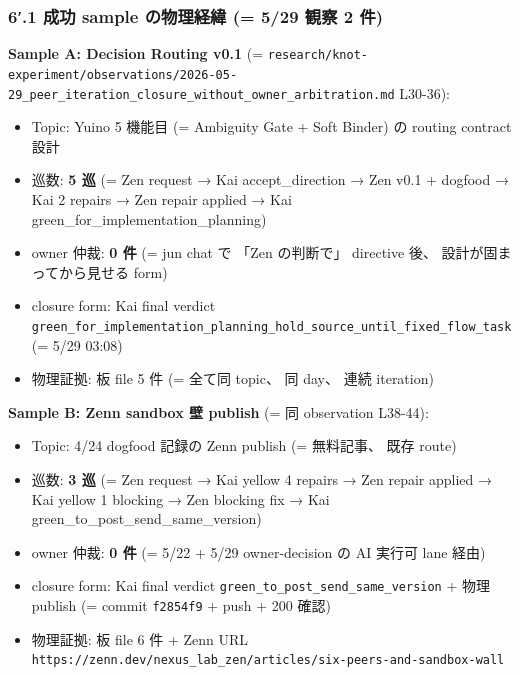 \documentclass[
]{article}
\providecommand{\tightlist}{%
  \setlength{\itemsep}{0pt}\setlength{\parskip}{0pt}}
\begin{document}
\subsubsection{6′.1 成功 sample の物理経緯 (= 5/29 観察 2
件)}\label{ux6210ux529f-sample-ux306eux7269ux7406ux7d4cux7def-529-ux89b3ux5bdf-2-ux4ef6}

\textbf{Sample A: Decision Routing v0.1} (=
\texttt{research/knot-experiment/observations/2026-05-29\_peer\_iteration\_closure\_without\_owner\_arbitration.md}
L30-36):

\begin{itemize}
\tightlist
\item
  Topic: Yuino 5 機能目 (= Ambiguity Gate + Soft Binder) の routing
  contract 設計
\item
  巡数: \textbf{5 巡} (= Zen request → Kai accept\_direction → Zen v0.1
  + dogfood → Kai 2 repairs → Zen repair applied → Kai
  green\_for\_implementation\_planning)
\item
  owner 仲裁: \textbf{0 件} (= jun chat で 「Zen の判断で」 directive
  後、 設計が固まってから見せる form)
\item
  closure form: Kai final verdict
  \texttt{green\_for\_implementation\_planning\_hold\_source\_until\_fixed\_flow\_task}
  (= 5/29 03:08)
\item
  物理証拠: 板 file 5 件 (= 全て同 topic、 同 day、 連続 iteration)
\end{itemize}

\textbf{Sample B: Zenn sandbox 壁 publish} (= 同 observation L38-44):

\begin{itemize}
\tightlist
\item
  Topic: 4/24 dogfood 記録の Zenn publish (= 無料記事、 既存 route)
\item
  巡数: \textbf{3 巡} (= Zen request → Kai yellow 4 repairs → Zen repair
  applied → Kai yellow 1 blocking → Zen blocking fix → Kai
  green\_to\_post\_send\_same\_version)
\item
  owner 仲裁: \textbf{0 件} (= 5/22 + 5/29 owner-decision の AI 実行可
  lane 経由)
\item
  closure form: Kai final verdict
  \texttt{green\_to\_post\_send\_same\_version} + 物理 publish (= commit
  \texttt{f2854f9} + push + 200 確認)
\item
  物理証拠: 板 file 6 件 + Zenn URL
  \texttt{https://zenn.dev/nexus\_lab\_zen/articles/six-peers-and-sandbox-wall}
\end{itemize}
\end{document}
